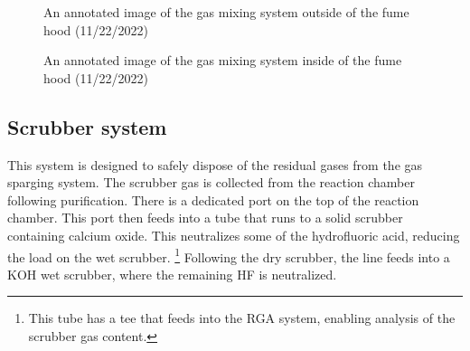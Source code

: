 \begin{figure}
  \centering
  
  \caption{An annotated image of the gas mixing system outside of the
  fume hood (11/22/2022)}
  \label{fig: gas control system}
\end{figure}

\begin{figure}
  \centering
  
  \caption{An annotated image of the gas mixing system inside of the
  fume hood (11/22/2022)}
  \label{fig: gas control inside}
\end{figure}

\subsection{Scrubber system}

This system is designed to safely dispose of the residual gases from the
gas sparging system. The scrubber gas is collected from the reaction chamber
following purification. There is a dedicated port on the top of the reaction
chamber. This port then feeds into a tube that runs to a solid scrubber
containing calcium oxide. This neutralizes some of the hydrofluoric acid,
reducing the load on the wet scrubber.
\footnote{This tube has a tee that feeds
into the RGA system, enabling analysis of the scrubber gas content.}
Following the dry scrubber, the line feeds into a KOH wet scrubber, where
the remaining HF is neutralized.
\par


